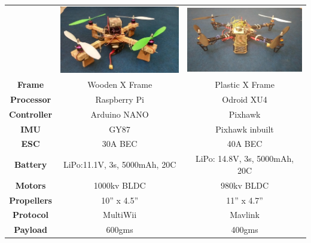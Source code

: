 \documentclass[12pt]{article}
\begin{document}
\begin{center}
\begin{tabular}{ |c|c|c| }
 \hline
  & \includegraphics[scale=0.3]{image01-2} & \includegraphics[scale=0.3]{image08-1} \\
 \textbf{Frame} & Wooden X Frame & Plastic X Frame \\
 \textbf{Processor} & Raspberry Pi & Odroid XU4 \\
 \textbf{Controller} & Arduino NANO & Pixhawk \\
 \textbf{IMU} & GY87 & Pixhawk inbuilt\\
 \textbf{ESC} & 30A BEC & 40A BEC\\
 \textbf{Battery} & LiPo:11.1V, 3s, 5000mAh, 20C & LiPo: 14.8V, 3s, 5000mAh, 20C \\
 \textbf{Motors} & 1000kv BLDC & 980kv BLDC \\
 \textbf{Propellers} & 10” x 4.5” & 11” x 4.7” \\
 \textbf{Protocol} & MultiWii & Mavlink\\
 \textbf{Payload} & 600gms & 400gms \\
 \hline
\end{tabular}
\end{center}
\end{document}
